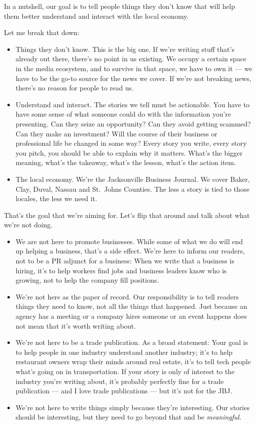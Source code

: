 \documentclass[
  11pt,
  american,
  letterpaperpaper,
  extrafontsizes,onecolumn,openright
  ]{memoir}
\providecommand{\tightlist}{%
  \setlength{\itemsep}{0pt}\setlength{\parskip}{0pt}}
\newlength{\rf}
\begin{document}
In a nutshell, our goal is to tell people things they don't know that will help them better understand and interact with the local economy.

Let me break that down:

\begin{itemize}
\tightlist
\item
  Things they don't know. This is the big one. If we're writing stuff that's already out there, there's no point in us existing. We occupy a certain space in the media ecosystem, and to survive in that space, we have to own it --- we have to be the go-to source for the news we cover. If we're not breaking news, there's no reason for people to read us.
\item
  Understand and interact. The stories we tell must be actionable. You have to have some sense of what someone could do with the information you're presenting. Can they seize an opportunity? Can they avoid getting scammed? Can they make an investment? Will the course of their business or professional life be changed in some way? Every story you write, every story you pitch, you should be able to explain why it matters. What's the bigger meaning, what's the takeaway, what's the lesson, what's the action item.
\item
  The local economy. We're the Jacksonville Business Journal. We cover Baker, Clay, Duval, Nassau and St.~Johns Counties. The less a story is tied to those locales, the less we need it.
\end{itemize}

That's the goal that we're aiming for. Let's flip that around and talk about what we're not doing.

\begin{itemize}
\tightlist
\item
  We are not here to promote businesses. While some of what we do will end up helping a business, that's a side effect. We're here to inform our readers, not to be a PR adjunct for a business: When we write that a business is hiring, it's to help workers find jobs and business leaders know who is growing, not to help the company fill positions.
\item
  We're not here as the paper of record. Our responsibility is to tell readers things they need to know, not all the things that happened. Just because an agency has a meeting or a company hires someone or an event happens does not mean that it's worth writing about.
\item
  We're not here to be a trade publication. As a broad statement: Your goal is to help people in one industry understand another industry; it's to help restaurant owners wrap their minds around real estate, it's to tell tech people what's going on in transportation. If your story is only of interest to the industry you're writing about, it's probably perfectly fine for a trade publication --- and I love trade publications --- but it's not for the JBJ.
\item
  We're not here to write things simply because they're interesting. Our stories should be interesting, but they need to go beyond that and be \emph{meaningful}.
\end{itemize}
\end{document}
